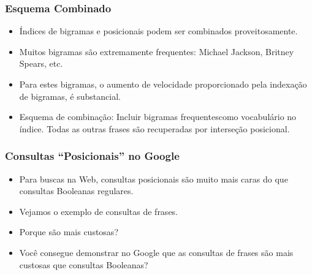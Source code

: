 \documentclass[compress]{beamer}
\begin{document}
\begin{frame}
\frametitle{Esquema Combinado}
\begin{itemize}[<+->]
\item Índices de bigramas e posicionais podem ser combinados proveitosamente.
\item Muitos bigramas são extremamente frequentes: Michael Jackson,
  Britney Spears,  etc.
\item Para estes bigramas, o aumento de velocidade proporcionado pela 
indexação de bigramas, é substancial.
\item Esquema de combinação: Incluir bigramas frequentescomo 
vocabulário no índice. Todas as outras frases são recuperadas por interseção 
posicional.
\end{itemize}
\end{frame}

\begin{frame}
\frametitle{Consultas ``Posicionais'' no Google}
\begin{itemize}[<+->]
\item Para buscas na Web, consultas posicionais são muito mais caras do que 
consultas Booleanas regulares.
\item Vejamos o exemplo de consultas de frases.
\item {\color{green} Porque são mais custosas?}
\item {\color{green}Você consegue demonstrar no Google que as consultas de 
frases são mais custosas que consultas Booleanas?}
\end{itemize}
\end{frame}


\end{document}
